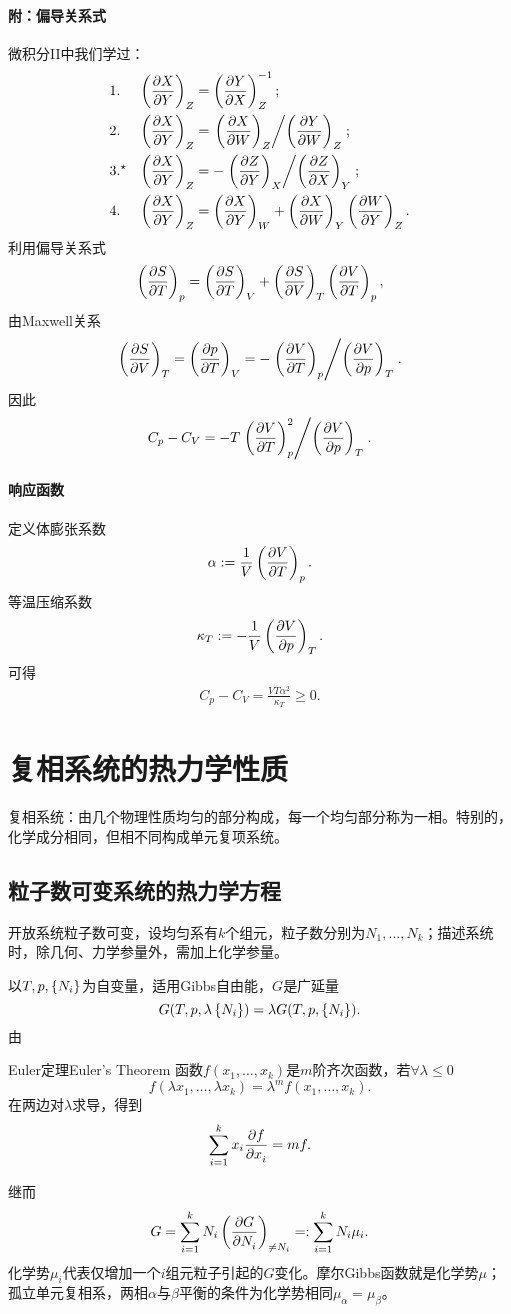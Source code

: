 \paragraph*{附：偏导关系式}
微积分II中我们学过：
\begin{align}
	 & 1.       & \kh{\pv XY}_Z & =\kh{\pv YX}_Z^{-1};                                             \\
	 & 2.       & \kh{\pv XY}_Z & =\dvd{\kh{\pv XW}_Z}{\kh{\pv YW}_Z};  \\
	 & 3.^\star & \kh{\pv XY}_Z & =-\dvd{\kh{\pv ZY}_X}{\kh{\pv ZX}_Y}; \\
	 & 4.       & \kh{\pv XY}_Z & =\kh{\pv XY}_W+\kh{\pv XW}_Y\kh{\pv WY}_Z.
\end{align}
\fi
利用偏导关系式
\begin{align*}
	\kh{\pv ST}_p=\kh{\pv ST}_V+\kh{\pv SV}_T\kh{\pv VT}_p,
\end{align*}
由Maxwell关系
\[
	\kh{\pv SV}_T=\kh{\pv pT}_V=-\dvd{\kh{\pv VT}_p}{\kh{\pv Vp}_T}.
\]
因此
\[
	C_p-C_V=-T\dvd{\kh{\pv VT}_p^2}{\kh{\pv Vp}_T}.
\]

\paragraph*{响应函数}定义体膨张系数
\begin{align}
	\alpha:=\frac1V\left(\frac{\partial^{\;\!\!}V}{\partial T^{\;\!\!}}\right)_p.
\end{align}
等温压缩系数
\begin{align}
	\kappa_T:=-\frac1V\left(\frac{\partial^{\;\!\!}V}{\partial p^{\;\!\!}}\right)_T.
\end{align}
可得
\begin{align}
	C_p-C_V=\frac{VT\alpha^2}{\kappa_T}\geqslant 0.
\end{align}


\clearpage
\section{复相系统的热力学性质}
复相系统：由几个物理性质均匀的部分构成，每一个均匀部分称为一相。特别的，化学成分相同，但相不同构成单元复项系统。
\subsection{粒子数可变系统的热力学方程}
开放系统粒子数可变，设均匀系有$k$个组元，粒子数分别为$N_1,\ldots,N_k$；描述系统时，除几何、力学参量外，需加上化学参量。

以$T,p,\left\{N_i\right\}$为自变量，适用Gibbs自由能，$G$是广延量
\[
	G(T,p,\lambda\left\{N_i\right\})=\lambda G(T,p,\left\{N_i\right\}).
\]
由
\begin{theorem}{Euler定理}{Euler's Theorem}
	函数$f(x_1,\ldots,x_k)$是$m$阶齐次函数，若$\forall\lambda\leqslant 0$
	\[
		f(\lambda x_1,\ldots,\lambda x_k)=\lambda^mf(x_1,\ldots,x_k).
	\]
	在两边对$\lambda$求导，得到
	\[
		\sum_{i=1}^kx_i\frac{\partial^{\;\!\!}f}{\partial x_i^{\;\!\!}}=mf.
	\]
\end{theorem}
继而
\[
	G=\sum_{i=1}^kN_i\left(\frac{\partial^{\;\!\!}G}{\partial N_i^{\;\!\!}}\right)_{\neq N_i}=:\sum_{i=1}^kN_i\mu_i.
\]
化学势$\mu_i$代表仅增加一个$i$组元粒子引起的$G$变化。摩尔Gibbs函数就是化学势$\mu$；孤立单元复相系，两相$\alpha$与$\beta$平衡的条件为化学势相同$\mu_\alpha=\mu_\beta$。
